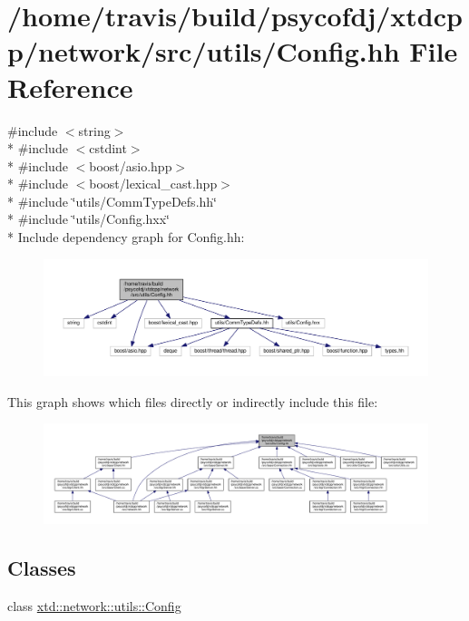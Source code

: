 \hypertarget{Config_8hh}{\section{/home/travis/build/psycofdj/xtdcpp/network/src/utils/\-Config.hh File Reference}
\label{Config_8hh}
}
{\ttfamily \#include $<$string$>$}\\*
{\ttfamily \#include $<$cstdint$>$}\\*
{\ttfamily \#include $<$boost/asio.\-hpp$>$}\\*
{\ttfamily \#include $<$boost/lexical\-\_\-cast.\-hpp$>$}\\*
{\ttfamily \#include \char`\"{}utils/\-Comm\-Type\-Defs.\-hh\char`\"{}}\\*
{\ttfamily \#include \char`\"{}utils/\-Config.\-hxx\char`\"{}}\\*
Include dependency graph for Config.\-hh\-:
\nopagebreak
\begin{figure}[H]
\begin{center}
\leavevmode
\includegraphics[width=350pt]{Config_8hh__incl}
\end{center}
\end{figure}
This graph shows which files directly or indirectly include this file\-:
\nopagebreak
\begin{figure}[H]
\begin{center}
\leavevmode
\includegraphics[width=350pt]{Config_8hh__dep__incl}
\end{center}
\end{figure}
\subsection*{Classes}
\begin{DoxyCompactItemize}
\item 
class \hyperlink{classxtd_1_1network_1_1utils_1_1Config}{xtd\-::network\-::utils\-::\-Config}
\end{DoxyCompactItemize}
